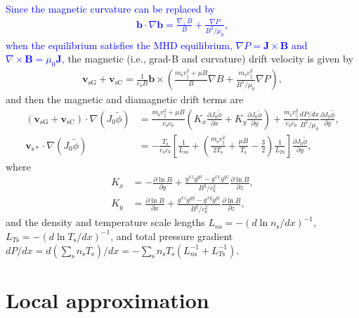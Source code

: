 \textcolor{blue}{Since the magnetic curvature can be replaced by
\begin{align}
  \bm{b}\cdot\nabla\bm{b} = \frac{\nabla_\perp B}{B} + \frac{\nabla P}{B^2/\mu_0},
\end{align}
when the equilibrium satisfies the MHD equilibrium, $\nabla P = \bm{J} \times \bm{B}$ and $\nabla \times \bm{B} = \mu_0 \bm{J}$,} the magnetic (i.e., grad-B and curvature) drift velocity is given by
\begin{align}
  \bm{v}_\mathrm{sG} + \bm{v}_\mathrm{sC} = \frac{1}{e_\mathrm{s} B} \bm{b} \times \left( \frac{m_\mathrm{s} v_\parallel^2 + \mu B}{B} \nabla B + \frac{m_\mathrm{s} v_\parallel^2}{B^2/ \mu_0} \nabla P \right),
\end{align}
and then the magnetic and diamagnetic drift terms are
\begin{align}
  (\bm{v}_\mathrm{sG} + \bm{v}_\mathrm{sC}) \cdot \nabla (J_0 \tilde{\phi}) &= \frac{m_\mathrm{s} v_\parallel^2 + \mu B}{e_\mathrm{s} c_b} \left( K_x \frac{\partial J_0 \tilde{\phi}}{\partial x} + K_y \frac{\partial J_0 \tilde{\phi}}{\partial y} \right) + \frac{m_\mathrm{s} v_\parallel^2}{e_\mathrm{s} c_b} \frac{dP/dx}{B^2/\mu_0} \frac{\partial J_0 \tilde{\phi}}{\partial y}, \\
  \bm{v}_\mathrm{s*} \cdot \nabla (J_0 \tilde{\phi}) &= - \frac{T_\mathrm{s}}{e_\mathrm{s} c_b} \left[ \frac{1}{L_{n\mathrm{s}}} + \left( \frac{m_\mathrm{s} v_\parallel^2}{2T_\mathrm{s}} + \frac{\mu B}{T_\mathrm{s}} - \frac{3}{2} \right) \frac{1}{L_{T\mathrm{s}}} \right] \frac{\partial J_0 \tilde{\phi}}{\partial y},
\end{align}
where
\begin{align}
  K_x &= - \frac{\partial \ln B}{\partial y} + \frac{g^{xz} g^{yx} - g^{xx} g^{yz}}{B^2/c_b^2} \frac{\partial \ln B}{\partial z}, 
  \label{eq:kkx} \\
  K_y &= \frac{\partial \ln B}{\partial x} + \frac{g^{xz} g^{yy} - g^{xy} g^{yz}}{B^2/c_b^2} \frac{\partial \ln B}{\partial z},
  \label{eq:kky}
\end{align}
and the density and temperature scale lengths $L_{n\mathrm{s}} = - (d\ln n_\mathrm{s}/dx)^{-1}$, $L_{T\mathrm{s}} = - (d\ln T_\mathrm{s}/dx)^{-1}$, and total pressure gradient $dP/dx = d (\sum_\mathrm{s} n_\mathrm{s} T_\mathrm{s})/dx = - \sum_\mathrm{s} n_\mathrm{s} T_\mathrm{s} (L_{n\mathrm{s}}^{-1}+L_{T\mathrm{s}}^{-1})$.




\section{Local approximation}
\label{sec:Local approximation}


